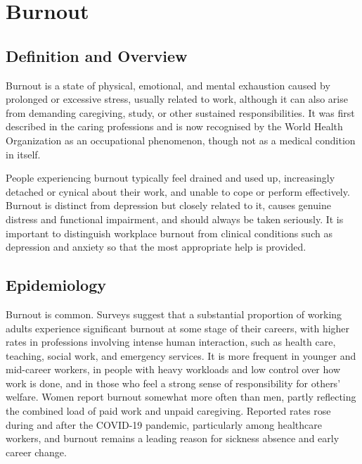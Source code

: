 \chapter{Burnout}

\section*{Definition and Overview}
Burnout is a state of physical, emotional, and mental exhaustion caused by prolonged or excessive stress, usually related to work, although it can also arise from demanding caregiving, study, or other sustained responsibilities. It was first described in the caring professions and is now recognised by the World Health Organization as an occupational phenomenon, though not as a medical condition in itself.

People experiencing burnout typically feel drained and used up, increasingly detached or cynical about their work, and unable to cope or perform effectively. Burnout is distinct from depression but closely related to it, causes genuine distress and functional impairment, and should always be taken seriously. It is important to distinguish workplace burnout from clinical conditions such as depression and anxiety so that the most appropriate help is provided.

\section*{Epidemiology}
Burnout is common. Surveys suggest that a substantial proportion of working adults experience significant burnout at some stage of their careers, with higher rates in professions involving intense human interaction, such as health care, teaching, social work, and emergency services. It is more frequent in younger and mid-career workers, in people with heavy workloads and low control over how work is done, and in those who feel a strong sense of responsibility for others' welfare. Women report burnout somewhat more often than men, partly reflecting the combined load of paid work and unpaid caregiving. Reported rates rose during and after the COVID-19 pandemic, particularly among healthcare workers, and burnout remains a leading reason for sickness absence and early career change.

